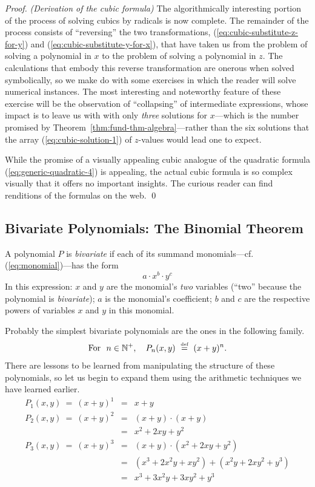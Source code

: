 \begin{proof} {\it (Derivation of the cubic formula)}
The algorithmically interesting portion of the process of solving
cubics by radicals is now complete.  The remainder of the process
consists of ``reversing'' the two transformations,
(\ref{eq:cubic-substitute-z-for-y}) and
(\ref{eq:cubic-substitute-y-for-x}), that have taken us from the
problem of solving a polynomial in $x$ to the problem of solving a
polynomial in $z$.  The calculations that embody this reverse
transformation are onerous when solved symbolically, so we make do
with some exercises in which the reader will solve numerical
instances.  The most interesting and noteworthy feature of these
exercise will be the observation of ``collapsing'' of intermediate
expressions, whose impact is to leave us with with only {\em three}
solutions for $x$---which is the number promised by
Theorem~\ref{thm:fund-thm-algebra}---rather than the six solutions
that the array (\ref{eq:cubic-solution-1}) of $z$-values would lead
one to expect.

While the promise of a visually appealing cubic analogue of the
quadratic formula (\ref{eq:generic-quadratic-4}) is appealing, the
actual cubic formula is so complex visually that it offers no
important insights.  The curious reader can find renditions of the
formulas on the web.  \qed
\end{proof}

\subsection{Bivariate Polynomials: The Binomial Theorem}
\label{sec:bivariate-polynomials}
\label{sec:Binomial-thm}

A polynomial $P$ is {\em bivariate} if each of its summand
monomials---cf. (\ref{eq:monomial})---has the form
\[ a \cdot x^b \cdot y^c \]
In this expression: $x$ and $y$ are the monomial's {\em two} variables
(``two'' because the polynomial is {\em bivariate}); $a$ is the
monomial's coefficient; $b$ and $c$ are the respective powers of
variables $x$ and $y$ in this monomial.

Probably the simplest bivariate polynomials are the ones in the
following family.
\begin{equation}
\label{eq:binomial-polys}
\mbox{For } \ n \in \mathbb{N}^+, \ \ \
P_n(x,y) \ \stackrel{\mbox{{\tiny def}}}{=} \ (x+y)^n.
\end{equation}
There are lessons to be learned from manipulating the structure of
these polynomials, so let us begin to expand them using the arithmetic
techniques we have learned earlier.
\begin{eqnarray*}
P_1(x,y) \ = \
(x+y)^1 & = & x+y  \\
P_2(x,y) \ = \
(x+y)^2 & = & (x+y) \cdot (x+y) \\
        & = & x^2 + 2xy + y^2 \\
P_3(x,y) \ = \
(x+y)^3 & = & (x+y) \cdot (x^2 + 2xy + y^2) \\
   & = & (x^3 + 2x^2y +  xy^2) + (x^2y + 2xy^2 + y^3) \\
   & = & x^3 + 3x^2y + 3xy^2 + y^3  
\end{eqnarray*}


